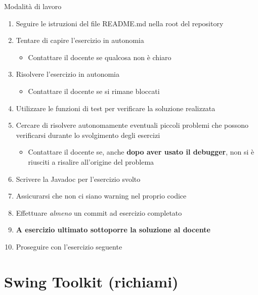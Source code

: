 \documentclass[presentation]{beamer}
\begin{document}
\begin{frame}{Modalità di lavoro}
	\begin{enumerate}
		\item Seguire le istruzioni del file README.md nella root del repository
		\item Tentare di capire l'esercizio in autonomia
		\begin{itemize}
			\item Contattare il docente se qualcosa non è chiaro
		\end{itemize}
		\item Risolvere l'esercizio in autonomia
		\begin{itemize}
			\item Contattare il docente se si rimane bloccati
		\end{itemize}
		\item Utilizzare le funzioni di test per verificare la soluzione realizzata
		\item Cercare di risolvere autonomamente eventuali piccoli problemi che possono verificarsi durante lo svolgimento degli esercizi
		\begin{itemize}
			\item Contattare il docente se, anche \textbf{dopo aver usato il debugger}, non si è riusciti a risalire all'origine del problema
		\end{itemize}
		\item Scrivere la Javadoc per l'esercizio svolto
		\item Assicurarsi che non ci siano warning nel proprio codice
		\item Effettuare \textit{almeno} un commit ad esercizio completato
		\item \textbf{A esercizio ultimato sottoporre la soluzione al docente}
		\item Proseguire con l'esercizio seguente
	\end{enumerate}
\end{frame}

\section{Swing Toolkit (richiami)}
\end{document}
